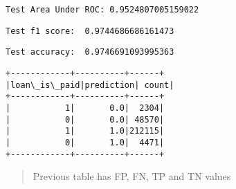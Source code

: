 \documentclass[11pt]{article}
\begin{document}
    \begin{Verbatim}[commandchars=\\\{\}]
Test Area Under ROC: 0.9524807005159022
    \end{Verbatim}

    \begin{Verbatim}[commandchars=\\\{\}]
Test f1 score:  0.9744686686161473
    \end{Verbatim}

    \begin{Verbatim}[commandchars=\\\{\}]
Test accuracy:  0.9746691093995363
    \end{Verbatim}

    \begin{Verbatim}[commandchars=\\\{\}]
+------------+----------+------+
|loan\_is\_paid|prediction| count|
+------------+----------+------+
|           1|       0.0|  2304|
|           0|       0.0| 48570|
|           1|       1.0|212115|
|           0|       1.0|  4471|
+------------+----------+------+

    \end{Verbatim}

    \begin{quote}
Previous table has FP, FN, TP and TN values
\end{quote}


    
    
    
\end{document}
